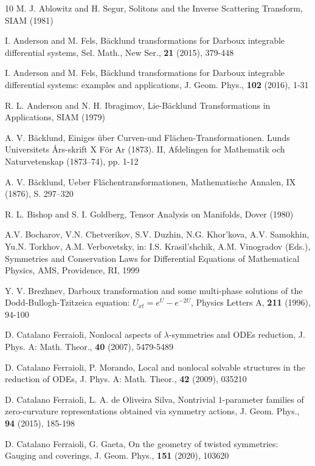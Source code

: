 \documentclass[12pt,english]{elsarticle}
\theoremstyle{plain}
\theoremstyle{plain}
\theoremstyle{remark}
\theoremstyle{plain}
\theoremstyle{definition}
\theoremstyle{definition}
\begin{document}
\begin{thebibliography}{10}
M. J. Ablowitz and H. Segur, Solitons and
the Inverse Scattering Transform, SIAM (1981)

I. Anderson and M. Fels, Bäcklund transformations
for Darboux integrable differential systems, Sel. Math., New Ser.,
\textbf{21} (2015), 379-448

I. Anderson and M. Fels, Bäcklund transformations
for Darboux integrable differential systems: examples and applications,
J. Geom. Phys., \textbf{102} (2016), 1-31

R. L. Anderson and N. H. Ibragimov, Lie-Bäcklund
Transformations in Applications, SIAM (1979)

A. V. Bäcklund, Einiges über Curven-und Flächen-Transformationen.
Lunds Universitets Års-skrift X För Ar (1873). II, Afdelingen for
Mathematik och Naturvetenskap (1873--74), pp. 1-12

A. V. Bäcklund, Ueber Flächentransformationen,
Mathematische Annalen, IX (1876), S. 297--320

R. L. Bishop and S. I. Goldberg, Tensor Analysis on Manifolds,
Dover (1980)

A.V. Bocharov, V.N. Chetverikov, S.V. Duzhin, N.G.
Khor'kova, A.V. Samokhin, Yu.N. Torkhov, A.M. Verbovetsky, in: I.S.
Krasil'shchik, A.M. Vinogradov (Eds.), Symmetries and Conservation
Laws for Differential Equations of Mathematical Physics, AMS, Providence,
RI, 1999

Y. V. Brezhnev, Darboux transformation and some multi-phase
solutions of the Dodd-Bullogh-Tzitzeica equation: $U_{xt}=e^{U}-e^{-2U}$,
Physics Letters A, \textbf{211} (1996), 94-100

D. Catalano Ferraioli, Nonlocal aspects of
$\lambda$-symmetries and ODEs reduction, J. Phys. A: Math. Theor.,
\textbf{40} (2007), 5479-5489

D. Catalano Ferraioli, P. Morando, Local and
nonlocal solvable structures in the reduction of ODEs, J. Phys. A:
Math. Theor., \textbf{42} (2009), 035210

D. Catalano Ferraioli, L. A. de Oliveira Silva,
Nontrivial $1$-parameter families of zero-curvature representations
obtained via symmetry actions, J. Geom. Phys.,\textbf{ 94 }(2015),
185-198

D. Catalano Ferraioli, G. Gaeta, On the geometry
of twisted symmetries: Gauging and coverings, J. Geom. Phys., \textbf{151}
(2020), 103620


\end{thebibliography}
\end{document}
